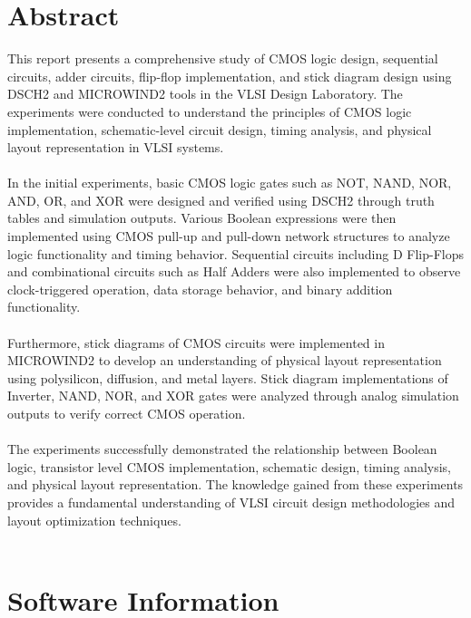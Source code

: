 \documentclass[12pt,a4paper]{report}
\begin{document}
\tableofcontents
\thispagestyle{empty}
\clearpage
{}

\pagestyle{fancy}
\fancyhf{} 							%
\rfoot{\thepage}

\chapter*{\center Abstract}
\thispagestyle{empty}

This report presents a comprehensive study of CMOS logic design, sequential circuits, adder circuits, flip-flop implementation, and stick diagram design using DSCH2 and MICROWIND2 tools in the VLSI Design Laboratory. The experiments were conducted to understand the principles of CMOS logic implementation, schematic-level circuit design, timing analysis, and physical layout representation in VLSI systems.\\ \\
In the initial experiments, basic CMOS logic gates such as NOT, NAND, NOR, AND, OR, and XOR were designed and verified using DSCH2 through truth tables and simulation outputs. Various Boolean expressions were then implemented using CMOS pull-up and pull-down network structures to analyze logic functionality and timing behavior. Sequential circuits including D Flip-Flops and combinational circuits such as Half Adders were also implemented to observe clock-triggered operation, data storage behavior, and binary addition functionality.\\ \\
Furthermore, stick diagrams of CMOS circuits were implemented in MICROWIND2 to develop an understanding of physical layout representation using polysilicon, diffusion, and metal layers. Stick diagram implementations of Inverter, NAND, NOR, and XOR gates were analyzed through analog simulation outputs to verify correct CMOS operation.\\ \\
The experiments successfully demonstrated the relationship between Boolean logic, transistor level CMOS implementation, schematic design, timing analysis, and physical layout representation. The knowledge gained from these experiments provides a fundamental understanding of VLSI circuit design methodologies and layout optimization techniques.\\ \\


\chapter*{\center Software Information}
\end{document}
